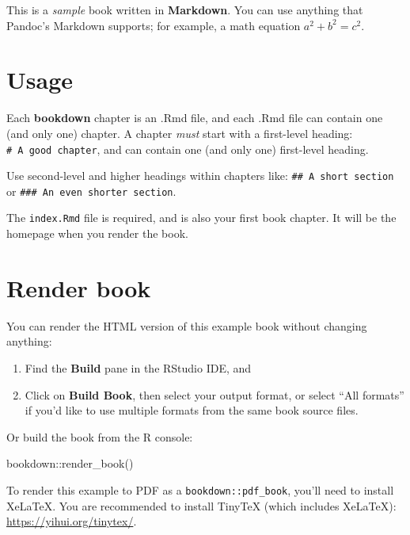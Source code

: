 \documentclass[12pt, oneside, openright]{byuthesis}
\newenvironment{Shaded}{\begin{snugshade}}{\end{snugshade}}
\newcommand{\FunctionTok}[1]{\textcolor[rgb]{0.00,0.00,0.00}{#1}}
\newcommand{\NormalTok}[1]{#1}
\newcommand{\SpecialCharTok}[1]{\textcolor[rgb]{0.00,0.00,0.00}{#1}}
\begin{document}
This is a \emph{sample} book written in \textbf{Markdown}. You can use anything that Pandoc's Markdown supports; for example, a math equation \(a^2 + b^2 = c^2\).

\hypertarget{usage}{%
\section{Usage}\label{usage}}

Each \textbf{bookdown} chapter is an .Rmd file, and each .Rmd file can contain one (and only one) chapter. A chapter \emph{must} start with a first-level heading: \texttt{\#\ A\ good\ chapter}, and can contain one (and only one) first-level heading.

Use second-level and higher headings within chapters like: \texttt{\#\#\ A\ short\ section} or \texttt{\#\#\#\ An\ even\ shorter\ section}.

The \texttt{index.Rmd} file is required, and is also your first book chapter. It will be the homepage when you render the book.

\hypertarget{render-book}{%
\section{Render book}\label{render-book}}

You can render the HTML version of this example book without changing anything:

\begin{enumerate}
\def\labelenumi{\arabic{enumi}.}
\item
  Find the \textbf{Build} pane in the RStudio IDE, and
\item
  Click on \textbf{Build Book}, then select your output format, or select ``All formats'' if you'd like to use multiple formats from the same book source files.
\end{enumerate}

Or build the book from the R console:

\begin{Shaded}
\begin{Highlighting}[]
\NormalTok{bookdown}\SpecialCharTok{::}\FunctionTok{render\_book}\NormalTok{()}
\end{Highlighting}
\end{Shaded}

To render this example to PDF as a \texttt{bookdown::pdf\_book}, you'll need to install XeLaTeX. You are recommended to install TinyTeX (which includes XeLaTeX): \url{https://yihui.org/tinytex/}.
\end{document}
